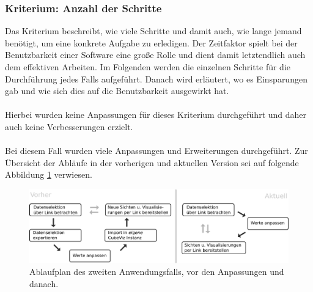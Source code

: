 \documentclass[11pt]{article}
\begin{document}
%
%
%
\subsubsection{Kriterium: Anzahl der Schritte}

Das Kriterium beschreibt, wie viele Schritte und damit auch, wie lange jemand benötigt, um eine konkrete Aufgabe zu erledigen. Der Zeitfaktor spielt bei der Benutzbarkeit einer Software eine große Rolle und dient damit letztendlich auch dem effektiven Arbeiten. Im Folgenden werden die einzelnen Schritte für die Durchführung jedes Falls aufgeführt. Danach wird erläutert, wo es Einsparungen gab und wie sich dies auf die Benutzbarkeit ausgewirkt hat.

\paragraph{} Hierbei wurden keine Anpassungen für dieses Kriterium durchgeführt und daher auch keine Verbesserungen erzielt. \\

\paragraph{} 


Bei diesem Fall wurden viele Anpassungen und Erweiterungen durchgeführt. Zur Übersicht der Abläufe in der vorherigen und aktuellen Version sei auf folgende Abbildung \ref{fig:Evaluation_UseCase2_OldNew} verwiesen. \\


%
%
\begin{figure}[h!]
    \centering
    \includegraphics[width=15cm]{Evaluation/UseCase2_OldNew.pdf}
    \caption{Ablaufplan des zweiten Anwendungsfalls, vor den Anpassungen und danach.}
    \label{fig:Evaluation_UseCase2_OldNew}
\end{figure}
\end{document}
